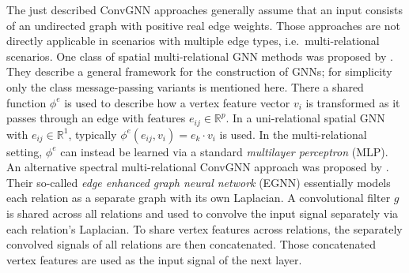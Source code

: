 \documentclass[12pt]{scrartcl}
\begin{document}
\begin{enumerate}[label=\textbf{\arabic*.}]
		The just described ConvGNN approaches generally assume that an input consists of an undirected graph with positive real edge weights.
		Those approaches are not directly applicable in scenarios with multiple edge types, i.e.\ multi-relational scenarios.
		One class of spatial multi-relational GNN methods was proposed by \citet{Battaglia2018}.
		They describe a general framework for the construction of GNNs; for simplicity only the class message-passing variants is mentioned here.
		There a shared function $\phi^e$ is used to describe how a vertex feature vector $v_i$ is transformed as it passes through an edge with features $e_{ij} \in \mathbb{R}^p$.
		In a uni-relational spatial GNN with $e_{ij} \in \mathbb{R}^{1}$, typically $\phi^e(e_{ij}, v_i) = e_k \cdot v_i$ is used.
		In the multi-relational setting, $\phi^e$ can instead be learned via a standard \textit{multilayer perceptron} (MLP).
		An alternative spectral multi-relational ConvGNN approach was proposed by \citet{Gong2018}.
		Their so-called \textit{edge enhanced graph neural network} (EGNN) essentially models each relation as a separate graph with its own Laplacian.
		A convolutional filter $g$ is shared across all relations and used to convolve the input signal separately via each relation's Laplacian.
		To share vertex features across relations, the separately convolved signals of all relations are then concatenated.
		Those concatenated vertex features are used as the input signal of the next layer.


\end{enumerate}
\end{document}
